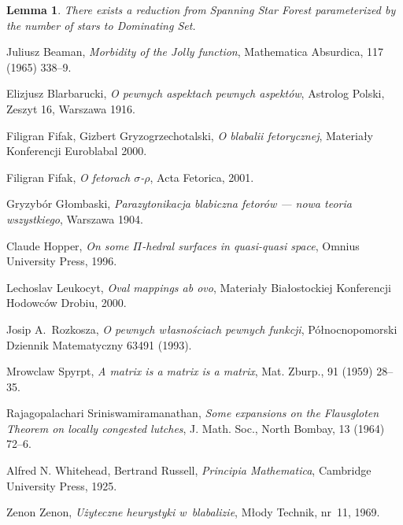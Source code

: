 \documentclass[en]{pracamgr}
\newtheorem{lemma}{Lemma}
\begin{document}
\begin{lemma}
	There exists a reduction from Spanning Star Forest parameterized by the
	number of stars to Dominating Set.
\end{lemma}


\begin{thebibliography}{99}

 Juliusz Beaman, \textit{Morbidity of the Jolly
    function}, Mathematica Absurdica, 117 (1965) 338--9.

 Elizjusz Blarbarucki, \textit{O pewnych
    aspektach pewnych aspektów}, Astrolog Polski, Zeszyt 16, Warszawa
  1916.

 Filigran Fifak, Gizbert Gryzogrzechotalski,
  \textit{O blabalii fetorycznej}, Materiały Konferencji Euroblabal
  2000.

 Filigran Fifak, \textit{O fetorach
    $\sigma$-$\rho$}, Acta Fetorica, 2001.

 Gryzybór Głombaski, \textit{Parazytonikacja
    blabiczna fetorów --- nowa teoria wszystkiego}, Warszawa 1904.

 Claude Hopper, \textit{On some $\Pi$-hedral
    surfaces in quasi-quasi space}, Omnius University Press, 1996.

 Lechoslav Leukocyt, \textit{Oval mappings ab ovo},
  Materiały Białostockiej Konferencji Hodowców Drobiu, 2000.

 Josip A.~Rozkosza, \textit{O pewnych własnościach
    pewnych funkcji}, Północnopomorski Dziennik Matematyczny 63491
  (1993).

 Mrowclaw Spyrpt, \textit{A matrix is a matrix
    is a matrix}, Mat. Zburp., 91 (1959) 28--35.

 Rajagopalachari Sriniswamiramanathan,
  \textit{Some expansions on the Flausgloten Theorem on locally
    congested lutches}, J. Math.  Soc., North Bombay, 13 (1964) 72--6.

 Alfred N. Whitehead, Bertrand Russell,
  \textit{Principia Mathematica}, Cambridge University Press, 1925.

 Zenon Zenon, \textit{Użyteczne heurystyki
    w~blabalizie}, Młody Technik, nr~11, 1969.

\end{thebibliography}
\end{document}
